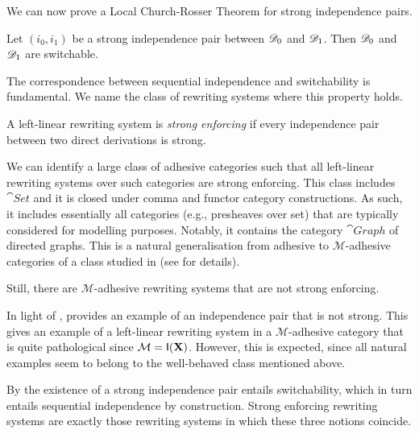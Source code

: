 We can now prove a Local Church-Rosser Theorem for strong independence pairs.

\begin{proposition}	\label{pr:church}
	Let $(i_0, i_1)$ be a strong independence pair
	between $\mathscr{D}_0$ and $\mathscr{D}_1$. Then $\mathscr{D}_0$ and
	$\mathscr{D}_1$ are switchable.
\end{proposition}

The correspondence between sequential independence and switchability
is fundamental. We name the class of rewriting systems where this property holds.

\begin{definition}
	A left-linear rewriting system is \emph{strong enforcing} if
	every independence pair between two direct derivations is strong.
\end{definition}

We can identify a large class of adhesive categories such that all
left-linear rewriting systems over such categories are strong
enforcing. This class includes $\cat{Set}$ and it is closed
under comma and functor category constructions.  As such, it includes
essentially all categories (e.g., presheaves over set) that are
typically considered for modelling purposes. Notably, it contains the
category $\cat{Graph}$ of directed graphs.
This is a natural generalisation from adhesive to $\mathcal{M}$-adhesive categories of a class studied in \cite{baldan2011adhesivity} (see  for details).

Still, there are $\mathcal{M}$-adhesive rewriting systems that are not strong enforcing.

\begin{example}
	\label{ex:diff2}
	In light of ,  provides an example of
	an independence pair that is not strong. This gives an example of a
	left-linear rewriting system in a $\mathcal{M}$-adhesive category that is quite
	pathological since $\mathcal{M}=\mathsf{I(\textbf {\textup{X}})}$. However, this is expected, 
	since all natural examples seem to belong to the well-behaved class mentioned above. 
\end{example}

\begin{remark}
	By  the existence of a strong independence pair
	entails switchability, which in turn entails sequential
	independence by construction. Strong enforcing rewriting systems are exactly
	those rewriting systems in which these three notions coincide.
\end{remark}

